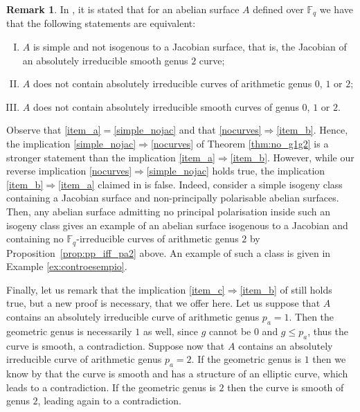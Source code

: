 \documentclass[11pt]{amsart}
\newcommand\Fq{\mathbb{F}_q}
\theoremstyle{plain}
\theoremstyle{definition}
\newtheorem{remark}[theorem]{Remark}
\begin{document}
\begin{remark}\label{rmk:gap}
    In \cite[Lemma~4.1]{MYFE1}, it is stated that for an abelian surface $A$ defined over $\Fq$ we have that the following statements are equivalent:
    \begin{enumerate}[(I)]
        \item\label{item_a} $A$ is simple and not isogenous to a Jacobian surface, that is, the Jacobian of an absolutely irreducible smooth genus $2$ curve;
        \item\label{item_b} $A$ does not contain absolutely irreducible curves of arithmetic genus $0$, $1$ or $2$;
        \item\label{item_c} $A$ does not contain absolutely irreducible smooth curves of genus $0$, $1$ or $2$.
    \end{enumerate}
    Observe that \ref{item_a}$=$\ref{simple_nojac} and that \ref{nocurves}$\Rightarrow$\ref{item_b}.
    Hence, the implication \ref{simple_nojac}$\Rightarrow$\ref{nocurves} of Theorem \ref{thm:no_g1g2} is a stronger statement than the implication \ref{item_a}$\Rightarrow$\ref{item_b}.
    However, while our reverse implication \ref{nocurves}$\Rightarrow$\ref{simple_nojac} holds true, the  implication \ref{item_b}$\Rightarrow$\ref{item_a} claimed in \cite[Lemma~4.1]{MYFE1} is false. 
    Indeed, consider a simple isogeny class containing a Jacobian surface and non-principally polarisable abelian surfaces. 
    Then, any 
    abelian surface admitting no principal polarisation inside such an isogeny class gives an example of an abelian surface isogenous to a Jacobian and containing no $\Fq$-irreducible curves of arithmetic genus $2$ by Proposition~\ref{prop:pp_iff_pa2} above.
    An example of such a class is given in Example \ref{ex:controesempio}.

    Finally, let us remark that the implication \ref{item_c}$\Rightarrow$\ref{item_b} of \cite[Lemma~4.1]{MYFE1} still holds true, but a new proof is necessary, that we offer here.
    Let us suppose that $A$ contains an absolutely irreducible curve of arithmetic genus $p_a=1$.
    Then the geometric genus is necessarily $1$ as well, since $g$ cannot be $0$ and $g\leq p_a$, thus the curve is smooth, a contradiction.
    Suppose now that  $A$ contains an absolutely irreducible curve of arithmetic genus $p_a=2$.
    If the geometric genus is $1$ then we know by \cite[Prop.~1]{Haloui17} that the curve is smooth and has a structure of an elliptic curve, which leads to a contradiction.
    If the geometric genus is $2$ then the curve is smooth of genus $2$, leading again to a contradiction.  
\end{remark}
\end{document}
